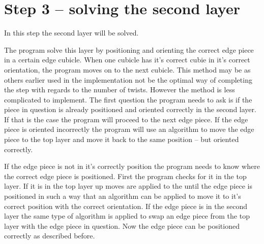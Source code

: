 \section{Step 3 -- solving the second layer}

In this step the second layer will be solved. 

The program solve this layer by positioning and orienting the correct edge piece in a certain edge cubicle. When one cubicle has it's correct cubie in it's correct orientation, the program moves on to the next cubicle. This method may be as others earlier used in the implementation not be the optimal way of completing the step with regards to the number of twists. However the method is less complicated to implement.
The first question the program needs to ask is if the piece in question is already positioned and oriented correctly in the second layer. If that is the case the program will proceed to the next edge piece. If the edge piece is oriented incorrectly the program will use an algorithm to move the edge piece to the top layer and  move it back to the same position -- but oriented correctly. 

If the edge piece is not in it's correctly position the program needs to know where the correct edge piece is positioned. First the program checks for it in the top layer. If it is in the top layer up moves are applied to the \rubik{} until the edge piece is positioned in such a way that an algorithm can be applied to move it to it's correct position with the correct orientation. If the edge piece is in the second layer the same type of algorithm is applied to swap an edge piece from the top layer with the edge piece in question. Now the edge piece can be positioned correctly as described before.

